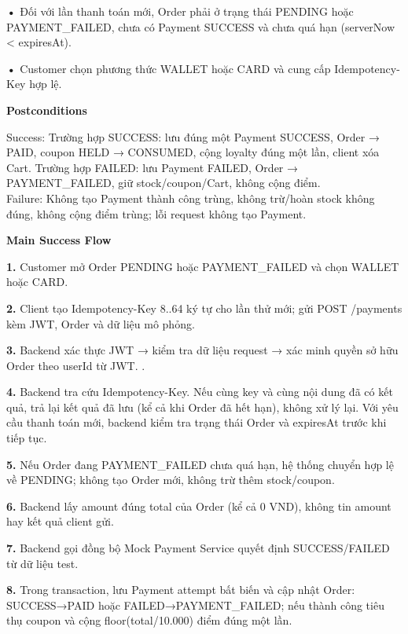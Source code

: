 \documentclass[11pt,a4paper,oneside]{report}
\begin{document}
\textbf{•} Đối với lần thanh toán mới, Order phải ở trạng thái PENDING hoặc PAYMENT\_FAILED, chưa có Payment SUCCESS và chưa quá hạn (serverNow \textless{} expiresAt).

\textbf{•} Customer chọn phương thức WALLET hoặc CARD và cung cấp Idempotency-Key hợp lệ.
\par

\par\smallskip\noindent\textcolor{sgublue}{\textbf{Postconditions}}\par\nobreak
Success: Trường hợp SUCCESS: lưu đúng một Payment SUCCESS, Order → PAID, coupon HELD → CONSUMED, cộng loyalty đúng một lần, client xóa Cart. Trường hợp FAILED: lưu Payment FAILED, Order → PAYMENT\_FAILED, giữ stock/coupon/Cart, không cộng điểm.\\
Failure: Không tạo Payment thành công trùng, không trừ/hoàn stock không đúng, không cộng điểm trùng; lỗi request không tạo Payment.\strut
\par

\par\smallskip\noindent\textcolor{sgublue}{\textbf{Main Success Flow}}\par\nobreak
\textbf{1.} Customer mở Order PENDING hoặc PAYMENT\_FAILED và chọn WALLET hoặc CARD.

\textbf{2.} Client tạo Idempotency-Key 8..64 ký tự cho lần thử mới; gửi POST /payments kèm JWT, Order và dữ liệu mô phỏng.

\textbf{3.} Backend xác thực JWT → kiểm tra dữ liệu request → xác minh quyền sở hữu Order theo userId từ JWT. .

\textbf{4.} Backend tra cứu Idempotency-Key. Nếu cùng key và cùng nội dung đã có kết quả, trả lại kết quả đã lưu (kể cả khi Order đã hết hạn), không xử lý lại. Với yêu cầu thanh toán mới, backend kiểm tra trạng thái Order và expiresAt trước khi tiếp tục.

\textbf{5.} Nếu Order đang PAYMENT\_FAILED chưa quá hạn, hệ thống chuyển hợp lệ về PENDING; không tạo Order mới, không trừ thêm stock/coupon.

\textbf{6.} Backend lấy amount đúng total của Order (kể cả 0 VND), không tin amount hay kết quả client gửi.

\textbf{7.} Backend gọi đồng bộ Mock Payment Service quyết định SUCCESS/FAILED từ dữ liệu test.

\textbf{8.} Trong transaction, lưu Payment attempt bất biến và cập nhật Order: SUCCESS→PAID hoặc FAILED→PAYMENT\_FAILED; nếu thành công tiêu thụ coupon và cộng floor(total/10.000) điểm đúng một lần.
\end{document}

